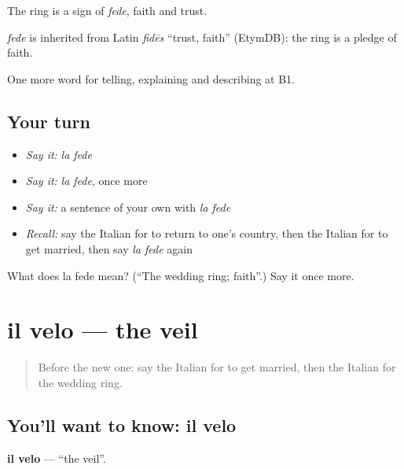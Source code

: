 The ring is a sign of \emph{fede}, faith and trust.

\begin{cousinweb}
\emph{fede} is inherited from Latin \emph{fidēs} \textquotedblleft{}trust, faith\textquotedblright{} (EtymDB): the ring is a pledge of faith.
\end{cousinweb}

\begin{grammarlens}[title={What you've built}]
One more word for telling, explaining and describing at B1.
\end{grammarlens}

\subsection*{Your turn}
\begin{itemize}
\raggedright
  \item \emph{Say it:} \emph{la fede}
  \item \emph{Say it:} \emph{la fede}, once more
  \item \emph{Say it:} a sentence of your own with \emph{la fede}
  \item \emph{Recall:} say the Italian for to return to one's country, then the Italian for to get married, then say \emph{la fede} again
\end{itemize}

\begin{tcolorbox}[breakable,colback=teal!4,colframe=teal!35!black,title={Before you move on}]
What does la fede mean? (\textquotedblleft{}The wedding ring; faith\textquotedblright{}.) Say it once more.
\end{tcolorbox}
\section[il velo]{il velo — the veil}

\label{lesson:IT-C311-velo}



\begin{quote}
Before the new one: say the Italian for to get married, then the Italian for the wedding ring.
\end{quote}

\subsection*{You'll want to know: il velo}
\textbf{il velo} — \textquotedblleft{}the veil\textquotedblright{}.

